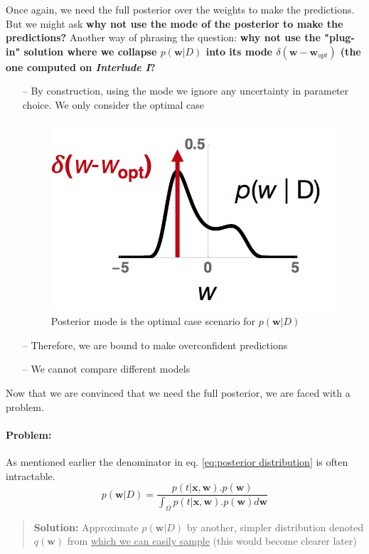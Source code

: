 \documentclass[main]{subfiles}
\begin{document}
\noindent Once again, we need the full posterior over the weights to make the predictions. But we might ask \textbf{why not use the mode of the posterior to make the predictions?}
\noindent
Another way of phrasing the question: \textbf{why not use the "plug-in" solution where we collapse $p(\bm{w}|D)$ into its mode $\delta(\bm{w}-\bm{w}_{opt})$ (the one computed on \textit{Interlude I}?}

\begin{itemize}
    \item[--] By construction, using the mode we ignore any uncertainty in parameter choice. We only consider the optimal case
    \begin{figure}[H]
    	\centering
    	\includegraphics[width=0.6\linewidth]{05_LearningAsBayesianInference/figures/posteriormode_delta.png}
    	\caption{Posterior mode is the optimal case scenario for $p(\bm{w}|D)$}
    	\label{fig:posterior_mode_delta}
    \end{figure}

    \item[--] Therefore, we are bound to make overconfident predictions
    \item[--] We cannot compare different models 
\end{itemize}

\noindent Now that we are convinced that we need the full posterior, we are faced with a problem.
\paragraph{Problem:}As mentioned earlier  the denominator in eq. \ref{eq:posterior distribution} is often intractable. 
\begin{equation*}
    p(\bm{w}|D) = \frac{p(t|\bm{x},\bm{w}).p(\bm{w})}{\int_\Omega p(t|\bm{x},\bm{w}). p(\bm{w}) d\bm{w}}
\end{equation*}
 
\begin{quote}
    \textbf{Solution:} Approximate $p(\bm{w}|D)$ by another, simpler distribution denoted $q(\bm{w})$ from \underline{which we can easily sample} (this would become clearer later)
\end{quote}
\end{document}
